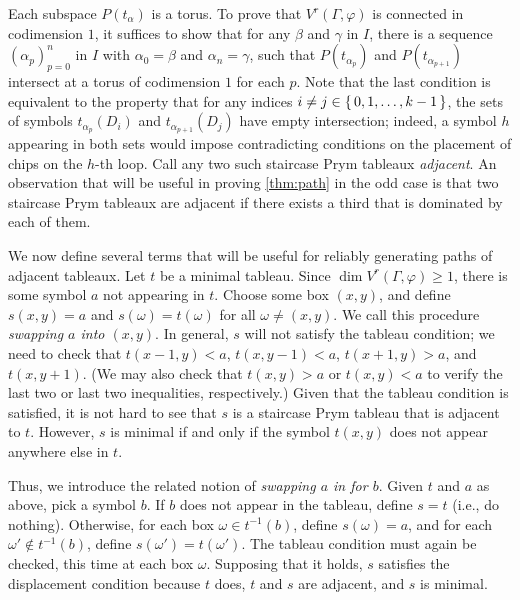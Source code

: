 \documentclass[11pt,reqno]{amsart}
\newcommand*{\Z}{\mathbb{Z}}
\newcommand{\yoav}[1]{{\color{blue} \sf  Yo$\alpha$v: [#1]}}
\newcommand{\caelan}[1]{\textcolor{orange}{\sf C: [#1]}}
\theoremstyle{definition}
\theoremstyle{problem}
\theoremstyle{plain}
\theoremstyle{remark}
\theoremstyle{theorem}
\numberwithin{equation}{section}
\numberwithin{figure}{section}
\theoremstyle{definition}
\theoremstyle{problem}
\theoremstyle{plain}
\begin{document}
Each subspace $P(t_\alpha)$ is a torus.
 To prove that $V^r(\Gamma,\varphi)$ is
 connected in codimension $1$, it suffices to show that for any $\beta$ and $\gamma$ in $I$, there
is a sequence $(\alpha_p)_{p=0}^n$ in $I$ with $\alpha_0 = \beta$
and $\alpha_n = \gamma$, such that $P(t_{\alpha_p})$ and
$P(t_{\alpha_{p+1}})$ intersect at a torus of codimension $1$ for each $p$.
Note that the last condition is equivalent to the property that for
any indices $i \neq j \in \set{0,1,\ldots,k-1}$, the sets of symbols
$t_{\alpha_p}(D_i)$ and $t_{\alpha_{p+1}}(D_j)$ have empty
intersection; indeed, a symbol $h$ appearing in both sets would impose
contradicting conditions on the placement of chips on the $h$-th loop.
Call any two such staircase Prym tableaux \textit{adjacent}.  An
observation that will be useful in proving \cref{thm:path} in the odd
case is that two staircase Prym tableaux are adjacent if there exists
a third that is dominated by each of them.

We now define several terms that will be useful for reliably
generating paths of adjacent tableaux.  Let $t$ be a minimal tableau.
Since $\dim V^r(\Gamma,\varphi) \geq 1$, there is some symbol $a$ not
appearing in $t$.  Choose some box $(x,y)$, and define $s(x,y) = a$
and $s(\omega) = t(\omega)$ for all $\omega \neq (x,y)$.  We call this
procedure \textit{swapping $a$ into $(x,y)$}.  In general, $s$ will
not satisfy the tableau condition; we need to check that
$t(x-1,y) < a$, $t(x,y-1) < a$, $t(x+1,y) > a$, and $t(x,y+1)$.  (We
may also check that $t(x,y) > a$ or $t(x,y) < a$ to verify the last
two or last two inequalities, respectively.)  Given that the tableau
condition is satisfied, it is not hard to see that $s$ is a staircase
Prym tableau that is adjacent to $t$.  However, $s$ is minimal if and
only if the symbol $t(x,y)$ does not appear anywhere else in $t$.

Thus, we introduce the related notion of \textit{swapping $a$ in for
  $b$}.  Given $t$ and $a$ as above, pick a symbol $b$.  If $b$ does
not appear in the tableau, define $s = t$ (i.e., do nothing).
Otherwise, for each box $\omega \in t^{-1}(b)$, define
$s(\omega) = a$, and for each $\omega' \nin t^{-1}(b)$, define
$s(\omega') = t(\omega')$.  The tableau condition must again be
checked, this time at each box $\omega$.  Supposing that it holds, $s$
satisfies the displacement condition because $t$ does, $t$ and $s$ are
adjacent, and $s$ is minimal.
\end{document}

